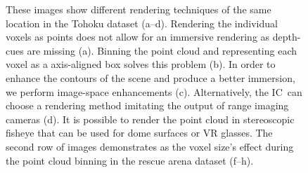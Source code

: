 \documentclass[conference,10pt,letter]{IEEEtran}
\def\IC{IC}
\begin{document}
\begin{figure}
{        \label{fig:cloud:25}
    }
    \caption{These images show different rendering techniques of the same location in the Tohoku dataset (a--d). Rendering the individual voxels as points does not allow for an immersive rendering as depth-cues are missing (a). Binning the point cloud and representing each voxel as a axis-aligned box solves this problem (b). In order to enhance the contours of the scene and produce a better immersion, we perform image-space enhancements (c). Alternatively, the \IC\ can choose a rendering method imitating the output of range imaging cameras (d). It is possible to render the point cloud in stereoscopic fisheye that can be used for dome surfaces or VR glasses. The second row of images demonstrates as the voxel size's effect during the point cloud binning in the rescue arena dataset (f--h).}
    \label{fig:cloud}
\end{figure}


%
%
\end{document}
